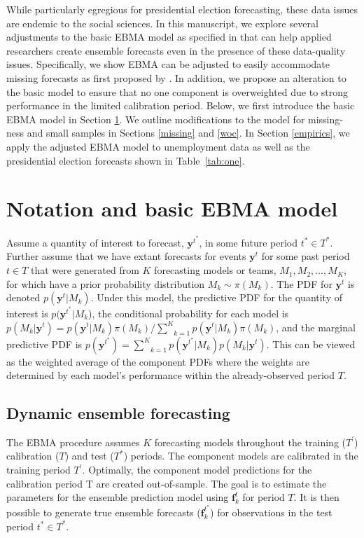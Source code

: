 \documentclass[12pt,fullpage,endnotes]{article}
\begin{document}
While particularly egregious for presidential election forecasting,
these data issues are endemic to the social sciences.  In this manuscript,
we explore several adjustments to the basic EBMA model as specified in
\citet{mhw:2012} that can help applied researchers create ensemble
forecasts even in the presence of these data-quality issues.
Specifically, we show EBMA can be adjusted to easily accommodate
missing forecasts as first proposed by \citep{Fraley:2010}.  In
addition, we propose an alteration to the basic model to ensure that
no one component is overweighted due to strong performance in the
limited calibration period.  Below, we first introduce the basic EBMA
model in Section \ref{model}.  We outline modifications to the model
for missing-ness and small samples in Sections \ref{missing} and
\ref{woc}. In Section \ref{empirics}, we apply the adjusted EBMA model
to unemployment data as well as the presidential election forecasts
shown in Table~\ref{tab:one}.


\section{Notation and basic EBMA model} 
\label{model}

Assume a quantity of interest to forecast, $\mathbf{y}^{t^*}$, in some
future period $t^\ast \in T^\ast$.  Further assume that we have extant
forecasts for events $\mathbf{y}^t$ for some past period $t \in T$
that were generated from $K$ forecasting models or teams, $M_1, M_2,
\ldots, M_K$, for which have a prior probability distribution $M_k\sim
\pi(M_k)$. The PDF for $\mathbf{y}^t$ is denoted
$p(\mathbf{y}^t|M_k)$.  Under this model, the predictive PDF for the
quantity of interest is $p(\mathbf{y}^{t^*}|M_k$), the conditional
probability for each model is $p(M_k|\mathbf{y}^t) =
p(\mathbf{y}^t|M_k)\pi(M_k)/\underset{k=1}{\overset{K}{\sum}}p(\mathbf{y}^t|M_k)\pi(M_k)$,
and the marginal predictive PDF is $p(\mathbf{y}^{t^*}) =
\underset{k=1}{\overset{K}{\sum}}
p(\mathbf{y}^{t^*}|M_k)p(M_k|\mathbf{y}^{t})$.  This can be
viewed as the weighted average of the component PDFs where the weights
are determined by each model's performance within the already-observed
period $T$.

\subsection{Dynamic ensemble forecasting}

The EBMA procedure assumes $K$ forecasting models throughout the training
($T^{\prime}$) calibration ($T$) and test ($T^\ast$) periods. The
component models are calibrated in the training period
$T^\prime$. Optimally, the component model predictions for the
calibration period T are created out-of-sample. The goal is to estimate
the parameters for the ensemble prediction model using
$\mathbf{f}^{t}_k$ for period $T$.  It is then possible to generate
true ensemble forecasts ($\mathbf{f}_k^{t^\ast}$) for observations in
the test period $t^\ast \in T^*$.
\end{document}
